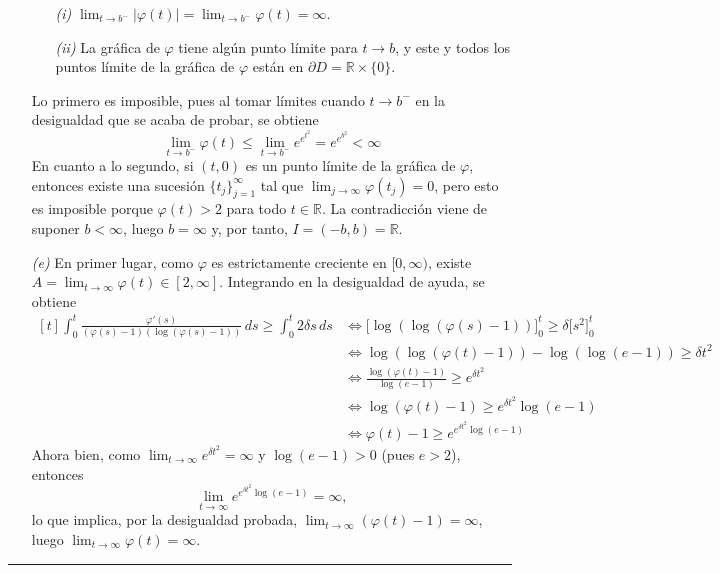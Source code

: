\documentclass[11pt]{report}
\newcommand{\R}{\mathbb R}
\begin{document}
\begin{itemize}
    \begin{itemize}
        \item[\textit{(i)}] $\displaystyle \lim_{t \to b^-} |\varphi(t)| = \lim_{t \to b^-} \varphi(t)=\infty$.
        \item[\textit{(ii)}] La gráfica de $\varphi$ tiene algún punto límite para $t \to b$, y este y todos los puntos límite de la gráfica de $\varphi$ están en $\partial D = \R \times \{0\}$.
    \end{itemize}
    Lo primero es imposible, pues al tomar límites cuando $t \to b^-$ en la desigualdad que se acaba de probar, se obtiene
    \[\lim_{t \to b^-} \varphi(t) \leq \lim_{t \to b^-}e^{e^{t^2}}=e^{e^{b^2}} < \infty\]
    En cuanto a lo segundo, si $(t,0)$ es un punto límite de la gráfica de $\varphi$, entonces existe una sucesión $\{t_j\}_{j=1}^\infty$ tal que $\lim_{j \to \infty} \varphi(t_j)=0$, pero esto es imposible porque $\varphi(t)>2$ para todo $t \in \R$. La contradicción viene de suponer $b < \infty$, luego $b= \infty$ y, por tanto, $I=(-b,b)=\R$.
    \item[\textit{(e)}] En primer lugar, como $\varphi$ es estrictamente creciente en $[0,\infty)$, existe $A = \lim_{t \to \infty} \varphi(t) \in [2,\infty]$. Integrando en la desigualdad de ayuda, se obtiene
    \[\begin{aligned}[t]
        \int_0^t \frac{\varphi'(s)}{(\varphi(s)-1)(\log(\varphi(s)-1))}\, ds \geq \int_0^t 2\delta s \, ds &\iff \bigl[\log(\log(\varphi(s)-1))\bigr]_0^t \geq \delta \bigl[s^2\bigr]_0^t \\
        &\iff \log(\log(\varphi(t)-1))-\log(\log(e-1))\geq \delta t^2 \\
        &\iff \frac{\log(\varphi(t)-1)}{\log(e-1)} \geq e^{\delta t^2} \\
        &\iff \log(\varphi(t)-1) \geq e^{\delta t^2}\log(e-1) \\
        &\iff \varphi(t)-1 \geq e^{e^{\delta t^2}\log(e-1)}
    \end{aligned} \]
    Ahora bien, como $\displaystyle\lim_{t \to \infty} e^{\delta t^2}=\infty$ y $\log(e-1)>0$ (pues $e>2$), entonces
    \[\lim_{t \to \infty} e^{e^{\delta t^2}\log(e-1)}=\infty,\]
    lo que implica, por la desigualdad probada, $\displaystyle\lim_{t \to \infty} (\varphi(t)-1)=\infty$, luego $\displaystyle\lim_{t \to \infty} \varphi(t)=\infty$.
\end{itemize}

\vspace{2mm}

\hrule
\end{document}
